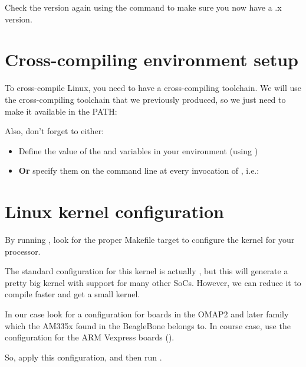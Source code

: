 Check the version again using the  command
to make sure you now have a \workingkernel.x version.

\section{Cross-compiling environment setup}

To cross-compile Linux, you need to have a cross-compiling
toolchain. We will use the cross-compiling toolchain that we
previously produced, so we just need to make it available in the PATH:


Also, don't forget to either:

\begin{itemize}
\item Define the value of the  and 
  variables in your environment (using )
\item {\bf Or} specify them on the command line at every invocation of
  , i.e.: 
\end{itemize}

\section{Linux kernel configuration}

By running , look for the proper Makefile target to
configure the kernel for your processor.

{The standard configuration for this kernel is actually ,
but this will generate a pretty big kernel with support for many other
SoCs. However, we can reduce it to compile faster and get a small
kernel.}{}

{In our case look for a configuration for boards in the OMAP2 and
later family which the AM335x found in the BeagleBone belongs to.}{}
{In course case, use the configuration for the ARM Vexpress boards
().}{}


So, apply this configuration, and then run .

